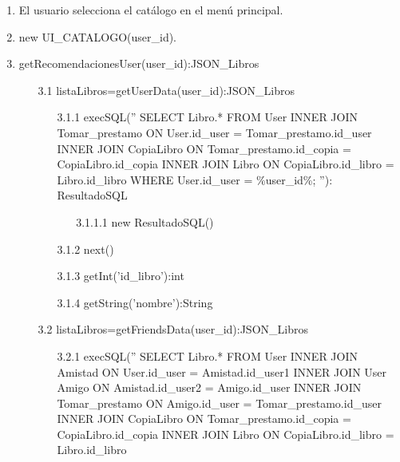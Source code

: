 ﻿\documentclass{report}
\begin{document}
            \begin{enumerate}
                \item El usuario selecciona el catálogo en el menú principal.
                \item new UI\_CATALOGO(user\_id).
                \item getRecomendacionesUser(user\_id):JSON\_Libros
                \begin{enumerate}
                    \item[3.1] listaLibros=getUserData(user\_id):JSON\_Libros
                    \begin{enumerate}
                        \item[3.1.1] execSQL(''
                            SELECT Libro.* 
                            FROM User 
                            INNER JOIN Tomar\_prestamo ON User.id\_user = Tomar\_prestamo.id\_user
                            INNER JOIN CopiaLibro ON Tomar\_prestamo.id\_copia = CopiaLibro.id\_copia
                            INNER JOIN Libro ON CopiaLibro.id\_libro = Libro.id\_libro
                            WHERE User.id\_user = \%user\_id\%;
                            ''): ResultadoSQL
                        \begin{enumerate}
                            \item[3.1.1.1] new ResultadoSQL()
                        \end{enumerate}
                        \item[3.1.2] next()
                        \item[3.1.3] getInt('id\_libro'):int
                        \item[3.1.4] getString('nombre'):String
                    \end{enumerate}
                    \item[3.2] listaLibros=getFriendsData(user\_id):JSON\_Libros
                    \begin{enumerate}
                        \item[3.2.1] execSQL(''
                            SELECT Libro.* 
                            FROM User 
                            INNER JOIN Amistad ON User.id\_user = Amistad.id\_user1
                            INNER JOIN User Amigo ON Amistad.id\_user2 = Amigo.id\_user
                            INNER JOIN Tomar\_prestamo ON Amigo.id\_user = Tomar\_prestamo.id\_user
                            INNER JOIN CopiaLibro ON Tomar\_prestamo.id\_copia = CopiaLibro.id\_copia
                            INNER JOIN Libro ON CopiaLibro.id\_libro = Libro.id\_libro

\end{enumerate}
\end{enumerate}
\end{enumerate}
\end{document}
